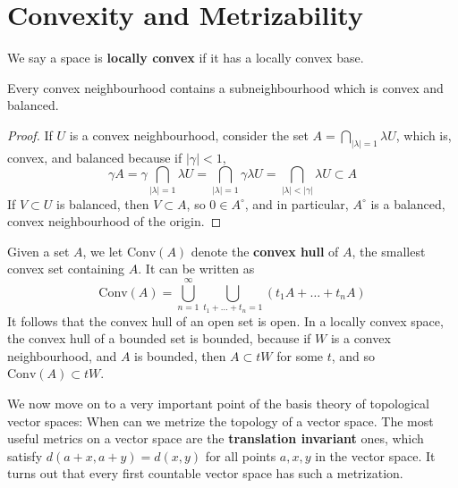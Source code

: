 \section{Convexity and Metrizability}

We say a space is {\bf locally convex} if it has a locally convex base.

\begin{theorem}
    Every convex neighbourhood contains a subneighbourhood which is convex and balanced.
\end{theorem}
\begin{proof}
    If $U$ is a convex neighbourhood, consider the set $A = \bigcap_{|\lambda| = 1} \lambda U$, which is, convex, and balanced because if $|\gamma| < 1$,
    \[ \gamma A = \gamma \bigcap_{|\lambda| = 1} \lambda U = \bigcap_{|\lambda| = 1} \gamma \lambda U = \bigcap_{|\lambda| < |\gamma|} \lambda U \subset A \]
    If $V \subset U$ is balanced, then $V \subset A$, so $0 \in A^\circ$, and in particular, $A^\circ$ is a balanced, convex neighbourhood of the origin.
\end{proof}

Given a set $A$, we let $\text{Conv}(A)$ denote the {\bf convex hull} of $A$, the smallest convex set containing $A$. It can be written as
%
\[ \text{Conv}(A) = \bigcup_{n = 1}^\infty \bigcup_{t_1 + \dots + t_n = 1} (t_1A + \dots + t_nA) \]
%
It follows that the convex hull of an open set is open. In a locally convex space, the convex hull of a bounded set is bounded, because if $W$ is a convex neighbourhood, and $A$ is bounded, then $A \subset tW$ for some $t$, and so $\text{Conv}(A) \subset tW$.

We now move on to a very important point of the basis theory of topological vector spaces: When can we metrize the topology of a vector space. The most useful metrics on a vector space are the {\bf translation invariant} ones, which satisfy $d(a + x, a + y) = d(x,y)$ for all points $a,x,y$ in the vector space. It turns out that every first countable vector space has such a metrization.

